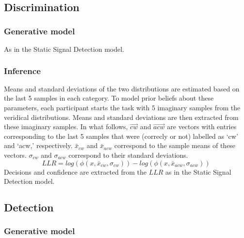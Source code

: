\documentclass[12pt,twoside]{reedthesis}
\begin{document}
\hypertarget{discrimination-2}{%
\subsection{Discrimination}\label{discrimination-2}}

\hypertarget{generative-model-4}{%
\subsubsection*{Generative model}\label{generative-model-4}}

As in the Static Signal Detection model.

\hypertarget{inference-4}{%
\subsubsection*{Inference}\label{inference-4}}

Means and standard deviations of the two distributions are estimated based on the last 5 samples in each category. To model prior beliefs about these parameters, each participant starts the task with 5 imaginary samples from the veridical distributions. Means and standard deviations are then extracted from these imaginary samples. In what follows, \(\vec{cw}\) and \(\vec{acw}\) are vectors with entries corresponding to the last 5 samples that were (correcly or not) labelled as `cw' and `acw,' respectively. \(\bar{x}_{cw}\) and \(\bar{x}_{acw}\) correspond to the sample means of these vectors. \(\sigma_{cw}\) and \(\sigma_{acw}\) correspond to their standard deviations.
\begin{equation}
LLR = log(\phi(x,\bar{x}_{cw},\sigma_{cw}))-log(\phi(x,\bar{x}_{acw},\sigma_{acw}))
\end{equation}
Decisions and confidence are extracted from the \(LLR\) as in the Static Signal Detection model.

\hypertarget{detection-4}{%
\subsection{Detection}\label{detection-4}}

\hypertarget{generative-model-5}{%
\subsubsection*{Generative model}\label{generative-model-5}}
\end{document}
